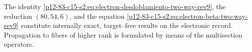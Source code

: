 \begin{statusbox}[title={Internal Closure of Bidirectional Refinement}]
The identity \eqref{p12-83-c15-s2:eq:electron-desdoblamiento-two-way-rev9}, the reduction
\((80,54,6)\), and the equation
\eqref{p12-83-c15-s2:eq:electron-beta-two-way-rev9} constitute internally exact,
target--free results on the electronic record. Propagation to fibers of
higher rank is formulated by means of the multisection operators.
\end{statusbox}
